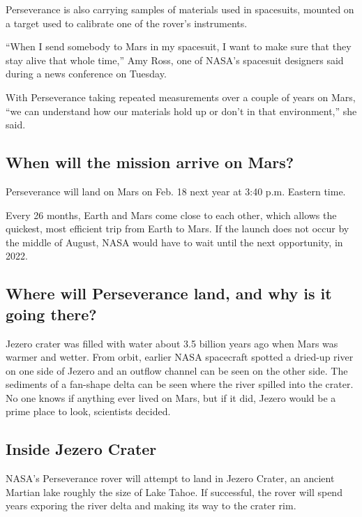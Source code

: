 Perseverance is also carrying samples of materials used in spacesuits,
mounted on a target used to calibrate one of the rover's instruments.

``When I send somebody to Mars in my spacesuit, I want to make sure that
they stay alive that whole time,'' Amy Ross, one of NASA's spacesuit
designers said during a news conference on Tuesday.

With Perseverance taking repeated measurements over a couple of years on
Mars, ``we can understand how our materials hold up or don't in that
environment,'' she said.

\hypertarget{when-will-the-mission-arrive-on-mars}{%
\subsection{When will the mission arrive on
Mars?}\label{when-will-the-mission-arrive-on-mars}}

Perseverance will land on Mars on Feb. 18 next year at 3:40 p.m. Eastern
time.

Every 26 months, Earth and Mars come close to each other, which allows
the quickest, most efficient trip from Earth to Mars. If the launch does
not occur by the middle of August, NASA would have to wait until the
next opportunity, in 2022.

\hypertarget{where-will-perseverance-land-and-why-is-it-going-there}{%
\subsection{Where will Perseverance land, and why is it going
there?}\label{where-will-perseverance-land-and-why-is-it-going-there}}

Jezero crater was filled with water about 3.5 billion years ago when
Mars was warmer and wetter. From orbit, earlier NASA spacecraft spotted
a dried-up river on one side of Jezero and an outflow channel can be
seen on the other side. The sediments of a fan-shape delta can be seen
where the river spilled into the crater. No one knows if anything ever
lived on Mars, but if it did, Jezero would be a prime place to look,
scientists decided.

\hypertarget{inside-jezero-crater}{%
\subsection{Inside Jezero Crater}\label{inside-jezero-crater}}

NASA's Perseverance rover will attempt to land in Jezero Crater, an
ancient Martian lake roughly the size of Lake Tahoe. If successful, the
rover will spend years exporing the river delta and making its way to
the crater rim.

